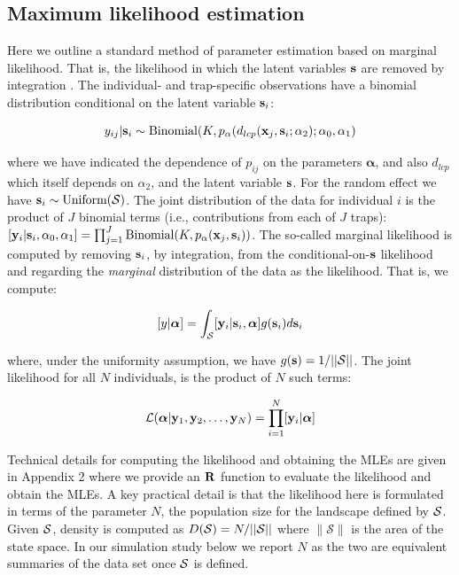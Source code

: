 \documentclass[12pt]{article}
\begin{document}
\begin{spacing}{1.8}
\section{Maximum likelihood estimation}
\label{sec.mle}

Here we outline a standard method of parameter estimation based on
marginal likelihood. That is, the likelihood in which the latent
variables ${\bf s}$ are removed by integration \citep{borchers_efford:2008}.
The individual- and trap-specific observations have a binomial
distribution conditional on the latent variable ${\bf s}_{i}$:

\begin{equation}
  y_{ij}| {\bf s}_{i} \sim \mbox{Binomial}(K, p_{\alpha}(d_{lcp}({\bf x}_{j},{\bf s}_{i};\alpha_{2}); \alpha_{0}, \alpha_{1})
\label{mle.eq.cond-on-s}
\end{equation}

{\flushleft where} we have indicated the dependence of $p_{ij}$ on the parameters
${\bm \alpha}$, and also $d_{lcp}$ which
itself depends on $\alpha_{2}$, and the latent variable ${\bf s}$.
For the random effect we have ${\bf s}_{i} \sim  \mbox{Uniform}({\cal
  S})$.
The joint distribution of the data for individual $i$ is the product
of $J$ binomial terms (i.e., contributions from each of $J$ traps):
$[{\bf y}_{i} | {\bf s}_{i} , \alpha_{0},\alpha_{1}] =
  \prod_{j=1}^{J} \mbox{Binomial}(K, p_{\alpha}({\bf x}_{j},{\bf s}_{i}) )$.
 The so-called marginal likelihood is computed by removing
${\bf s}_{i}$, by integration,  from the conditional-on-${\bf s}$
likelihood and regarding the {\it marginal} distribution of the data
as the likelihood. That
is, we compute:

\[
  [y|{\bm \alpha}] =
\int_{{\cal S}}  [ {\bf y}_{i} |{\bf s}_{i},{\bm \alpha}] g({\bf s}_{i}) d{\bf s}_{i}
\]

{\flushleft where}, under the uniformity assumption, we have
$g({\bf s}) = 1/||{\cal S}||$.
The joint likelihood for all $N$ individuals,
is the product of $N$ such terms:

\[
{\cal L}({\bm \alpha} | {\bf y}_{1},{\bf y}_{2},\ldots, {\bf y}_{N}) 
= \prod_{i=1}^{N} [{\bf y}_{i}|{\bm \alpha}]
\]

Technical details for computing the likelihood and obtaining the MLEs
are given in Appendix 2 where we provide an ${\bf R}$ function
to evaluate the likelihood and obtain the MLEs.
A key practical detail is that the likelihood here is formulated in
terms of the parameter $N$, the population size for the landscape
defined by ${\cal S}$. Given ${\cal S}$, density
is
computed as $D({\cal S}) = N/||{\cal S}||$ where $\|\mathcal{S}\|$ is
the area of the state space. In our simulation study
below we report $N$ as the two are equivalent summaries of the data
set once ${\cal S}$ is defined.



\end{spacing}
\end{document}
